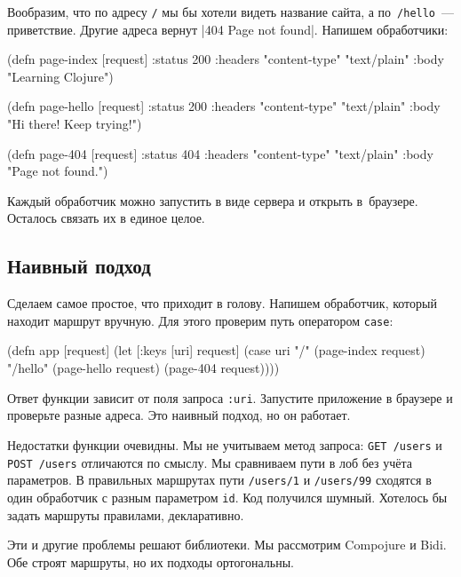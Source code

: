 Вообразим, что по адресу \verb|/| мы бы хотели видеть название сайта, а
по~\verb|/hello|~--- приветствие. Другие адреса вернут
\spverb|404 Page not found|. Напишем обработчики:

\begin{english}
  \begin{clojure}
(defn page-index [request]
  {:status 200
   :headers {"content-type" "text/plain"}
   :body "Learning Clojure"})

(defn page-hello [request]
  {:status 200
   :headers {"content-type" "text/plain"}
   :body "Hi there! Keep trying!"})

(defn page-404 [request]
  {:status 404
   :headers {"content-type" "text/plain"}
   :body "Page not found."})
  \end{clojure}
\end{english}

Каждый обработчик можно запустить в виде сервера и открыть в~браузере. Осталось
связать их в единое целое.

\subsection{Наивный подход}

Сделаем самое простое, что приходит в голову. Напишем обработчик, который
находит маршрут вручную. Для этого проверим путь оператором \verb|case|:

\begin{english}
  \begin{clojure}
(defn app [request]
  (let [{:keys [uri]} request]
    (case uri
      "/"      (page-index request)
      "/hello" (page-hello request)
      (page-404 request))))
  \end{clojure}
\end{english}

Ответ функции зависит от поля запроса \verb|:uri|. Запустите приложение в
браузере и проверьте разные адреса. Это наивный подход, но он работает.

Недостатки функции очевидны. Мы не учитываем метод запроса:
\verb|GET /users| и \verb|POST /users| отличаются по смыслу. Мы сравниваем пути
в лоб без учёта параметров. В правильных маршрутах пути \verb|/users/1| и
\verb|/users/99| сходятся в один обработчик с разным параметром \verb|id|. Код
получился шумный. Хотелось бы задать маршруты правилами, декларативно.

Эти и другие проблемы решают библиотеки. Мы рассмотрим Compojure и Bidi. Обе
строят маршруты, но их подходы ортогональны.

